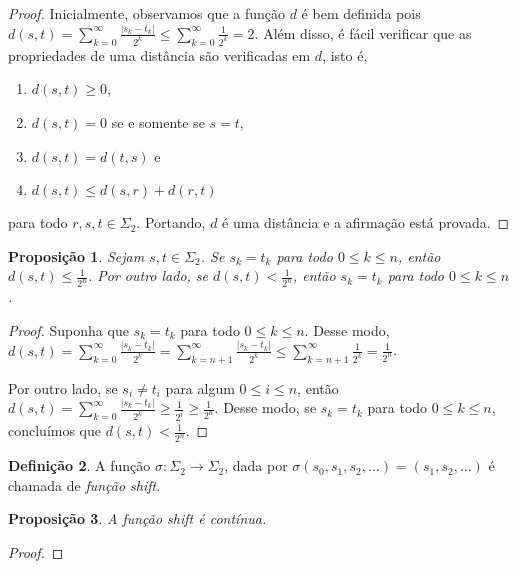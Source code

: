 \documentclass[a4paper, 12pt]{article}
\theoremstyle{definition}
\newtheorem{definition}{Definição}[section]
\theoremstyle{plain}
\newtheorem{proposition}[definition]{Proposição}
\theoremstyle{plain}
\theoremstyle{plain}
\theoremstyle{remark}
\begin{document}
\begin{proof}
Inicialmente, observamos que a função $d$ é bem definida pois $d(s, t) = \sum_{k=0}^{\infty} \frac{|s_k - t_k|}{2^k} \leq \sum_{k=0}^{\infty} \frac{1}{2^k} = 2$. Além disso, é fácil verificar que as propriedades de uma distância são verificadas em $d$, isto é,
\begin{enumerate}[label=(\alph*)]
\item $d(s, t) \geq 0$,
\item $d(s, t) = 0$ se e somente se $s = t$,
\item  $d(s, t) = d(t, s)$ e 
\item $d(s, t) \leq d(s, r) + d(r, t)$
\end{enumerate}
para todo $r, s, t \in \Sigma_2$. Portando, $d$ é uma distância e a afirmação está provada.
\end{proof}

\begin{proposition}
Sejam $s, t \in \Sigma_2$. Se $s_k = t_ k$ para todo $0 \leq k \leq n$, então $d(s, t) \leq \frac{1}{2^n}$. Por outro lado, se $d(s, t) < \frac{1}{2^n}$, então $s_k = t_k$ para todo $0 \leq k \leq n$.
\end{proposition}

\begin{proof}
Suponha que $s_k = t_ k$ para todo $0 \leq k \leq n$. Desse modo, $d(s, t) = \sum_{k=0}^{\infty} \frac{|s_k - t_k|}{2^k} = \sum_{k=n+1}^{\infty} \frac{|s_k - t_k|}{2^k} \leq \sum_{k=n+1}^{\infty} \frac{1}{2^k} = \frac{1}{2^n}$.

Por outro lado, se $s_i \neq t_i$ para algum $0 \leq i \leq n$, então $d(s, t) = \sum_{k=0}^{\infty} \frac{|s_k - t_k|}{2^k} \geq \frac{1}{2^i} \geq \frac{1}{2^n}$. Desse modo, se $s_k = t_k$ para todo $0 \leq k \leq n$, concluímos que $d(s, t) < \frac{1}{2^n}$.
\end{proof}

\begin{definition}
A função $\sigma: \Sigma_2 \rightarrow \Sigma_2$, dada por $\sigma(s_0, s_1, s_2, \dots) = (s_1, s_2, \dots)$ é chamada de \textit{função shift}.
\end{definition}

\begin{proposition}
A função shift é contínua.
\end{proposition}

\begin{proof}

\end{proof}
\end{document}
